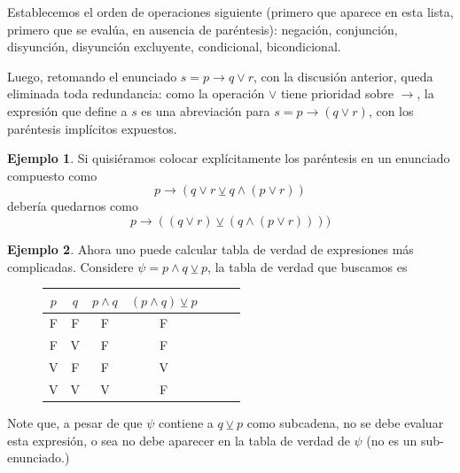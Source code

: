 \documentclass{book}
\theoremstyle{definition}
\newtheorem{ejm}{Ejemplo}[chapter]
\begin{document}
Establecemos el orden de operaciones siguiente (primero que aparece en esta lista, primero que se evalúa, en ausencia de paréntesis): negación, conjunción, disyunción, disyunción excluyente, condicional, bicondicional.

Luego, retomando el enunciado $s=p\rightarrow q \vee r$, con la discusión anterior, queda eliminada toda redundancia: como la operación $\vee$ tiene prioridad sobre $\rightarrow$, la expresión que define a $s$ es una abreviación para $s=p\rightarrow (q \vee r)$, con los paréntesis implícitos expuestos.

\begin{ejm}
	Si quisiéramos colocar explícitamente los paréntesis en un enunciado compuesto como \[p \rightarrow (q \vee r \veebar q \wedge (p \vee r)) \]
	debería quedarnos como
	\[p \rightarrow ((q \vee r) \veebar (q \wedge (p \vee r)))) \]
\end{ejm}

\begin{ejm}
	Ahora uno puede calcular tabla de verdad de expresiones más complicadas. Considere $\psi = p \wedge q\veebar p$, la tabla de verdad que buscamos es
	\begin{figure}[h]
		\begin{center}\begin{tabular}{|c|c||c|c|c|c|c|}
				\hline 
				$p$& $q$ & $p \wedge q $ & $(p \wedge q) \veebar p$ \\
				\hline \hline
				F & F & F & F \\
				\hline
				F & V & F & F \\
				\hline
				V & F & F & V \\
				\hline
				V & V & V & F \\
				\hline
	\end{tabular}\end{center}\end{figure}
	
	Note que, a pesar de que $\psi$ contiene a $q\veebar p$ como subcadena, no se debe evaluar esta expresión, o sea no debe aparecer en la tabla de verdad de $\psi$ (no es un sub-enunciado.)
\end{ejm}
\end{document}
